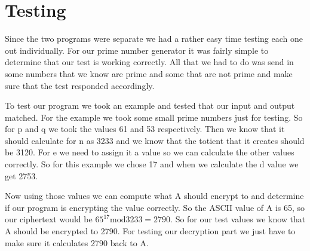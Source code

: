 \documentclass[11pt,technote]{IEEEtran}
\begin{document}
\section{Testing}
Since the two programs were separate we had a rather easy time testing each one 
out individually. 
For our prime number generator it was fairly simple to determine that our test 
is working correctly. All that we had to do was send in some numbers that we 
know are prime and some that are not prime and make sure that the test
responded accordingly.
\par To test our program we took an example and tested that our input and output 
matched. For the example we took some small prime numbers just for testing. So 
for p and q we took the values 61 and 53 respectively. Then we know that it 
should calculate for n as 3233 and we know that the totient that it creates 
should be 3120. For e we need to assign it a value so we can calculate the other 
values correctly. So for this example we chose 17 and when we calculate the d 
value we get 2753. 
\par Now using those values we can compute what A should encrypt to and 
determine if our program is encrypting the value correctly. So the ASCII value 
of A is 65, so our ciphertext would be ${65}^{17}\mathrm{mod}3233=2790$. So for 
our test values we know that A should be encrypted to 2790. For testing our 
decryption part we just have to make sure it calculates 2790 back to A.
\end{document}
